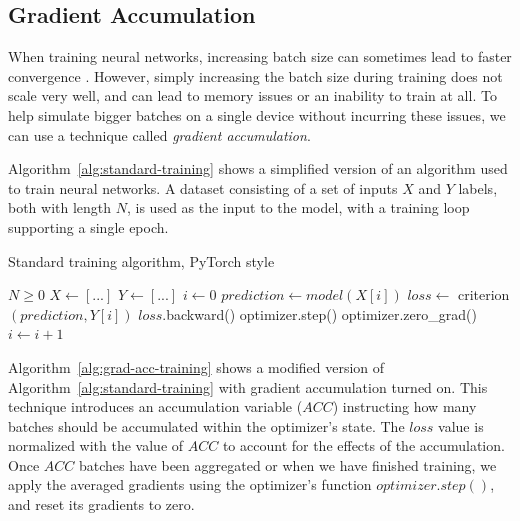 \subsection{Gradient Accumulation}\label{sec:gradient-accumulation}

When training neural networks, increasing batch size can sometimes lead to faster convergence \cite{Krizhevsky2014owt, goyal2017accurate, you2017scaling}.
However, simply increasing the batch size during training does not scale very well, and can lead to memory issues or an inability to train at all.
To help simulate bigger batches on a single device without incurring these issues, we can use a technique called \textit{gradient accumulation}.

Algorithm~\ref{alg:standard-training} shows a simplified version of an algorithm used to train neural networks.
A dataset consisting of a set of inputs $X$ and $Y$ labels, both with length $N$, is used as the input to the model, with a training loop supporting a single epoch.


\begin{algorithm}
    \caption{Standard training algorithm, PyTorch style}\label{alg:standard-training}
    \begin{algorithmic}
        \Require $N \geq 0$
        \State $X \gets [...]$ 
        \State $Y \gets [...]$ 
        \State $i \gets 0$
        \State $prediction \gets model(X[i])$
        \State $loss \gets $ criterion$(prediction, Y[i])$
        \State $loss$.backward()
        \State optimizer.step()
        \State optimizer.zero\_grad()
        \State $i \gets i + 1$
        \EndWhile
    \end{algorithmic}
\end{algorithm}

Algorithm~\ref{alg:grad-acc-training} shows a modified version of Algorithm~\ref{alg:standard-training} with gradient accumulation turned on.
This technique introduces an accumulation variable ($ACC$) instructing how many batches should be accumulated within the optimizer's state.
The $loss$ value is normalized with the value of $ACC$ to account for the effects of the accumulation.
Once $ACC$ batches have been aggregated or when we have finished training, we apply the averaged gradients using the optimizer's function $optimizer.step()$, and reset its gradients to zero.

